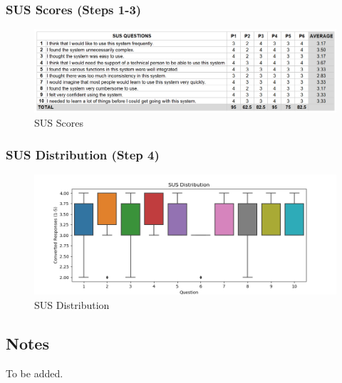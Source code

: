 \documentclass[a4 paper, 12pt]{article}
\begin{document}
    \subsubsection*{SUS Scores (Steps 1-3)}
        \begin{figure} [H]
            \centering
            \includegraphics[width=\textwidth, frame]
                {./Med_Fidelity/Med_SUS_Scores.PNG}  
            \caption{SUS Scores}
        \end{figure}
    
    \subsubsection*{SUS Distribution (Step 4)}
        \begin{figure} [H]
            \centering
            \includegraphics[width=\textwidth, frame]
                {./Med_Fidelity/Med_SUS_Distrib.PNG}  
            \caption{SUS Distribution}
        \end{figure}

    \pagebreak  
    \subsection{Notes}     
    \label{sec:B.8}     
    To be added.
\end{document}

